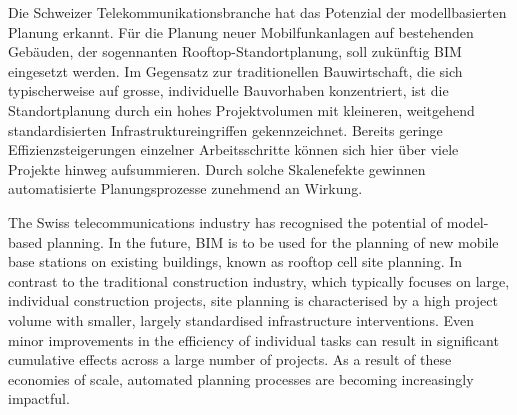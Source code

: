\begin{German}
    Die Schweizer Telekommunikationsbranche hat das Potenzial der modellbasierten Planung erkannt. Für die Planung neuer Mobilfunkanlagen auf bestehenden Gebäuden, der sogennanten Rooftop-Standortplanung, soll zukünftig BIM eingesetzt werden. Im Gegensatz zur traditionellen Bauwirtschaft, die sich typischerweise auf grosse, individuelle Bauvorhaben konzentriert, ist die Standortplanung durch ein hohes Projektvolumen mit kleineren, weitgehend standardisierten Infrastruktureingriffen gekennzeichnet. Bereits geringe Effizienzsteigerungen einzelner Arbeitsschritte können sich hier über viele Projekte hinweg aufsummieren. Durch solche Skalenefekte gewinnen automatisierte Planungsprozesse zunehmend an Wirkung.
\end{German}

\begin{English}
    The Swiss telecommunications industry has recognised the potential of model-based planning. In the future, BIM is to be used for the planning of new mobile base stations on existing buildings, known as rooftop cell site planning. In contrast to the traditional construction industry, which typically focuses on large, individual construction projects, site planning is characterised by a high project volume with smaller, largely standardised infrastructure interventions. Even minor improvements in the efficiency of individual tasks can result in significant cumulative effects across a large number of projects. As a result of these economies of scale, automated planning processes are becoming increasingly impactful.
\end{English}

